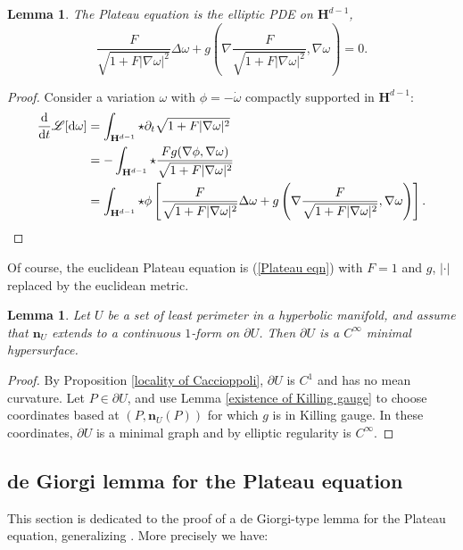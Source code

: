 \documentclass[reqno,12pt,letterpaper]{amsart}
\newcommand{\Hyp}{\mathbf H}
\newcommand*\dif{\mathop{}\!\mathrm{d}}
\newcommand{\Lagrange}{\mathscr L}
\newcommand{\normal}{\mathbf n}
\newtheorem{lemma}[theorem]{Lemma}
\theoremstyle{definition}
\numberwithin{equation}{section}
\begin{document}
\begin{lemma}
The Plateau equation is the elliptic PDE on $\Hyp^{d - 1}$,
\begin{equation}\label{Plateau eqn}
\frac{F}{\sqrt{1 + F |\nabla \omega|^2}} \Delta \omega + g\left(\nabla \frac{F}{\sqrt{1 + F |\nabla \omega|^2}}, \nabla \omega\right) = 0.
\end{equation}
\end{lemma}
\begin{proof}
Consider a variation $\omega$ with $\phi = -\dot \omega$ compactly supported in $\Hyp^{d - 1}$:
\begin{align*}
\frac{\dif}{\dif t} \Lagrange[\dif \omega] &= \int_{\Hyp^{d - 1}} \star \partial_t \sqrt{1 + F |\nabla \omega|^2} \\
&= -\int_{\Hyp^{d - 1}} \star \frac{F g(\nabla \phi, \nabla \omega)}{\sqrt{1 + F|\nabla \omega|^2}} \\
&= \int_{\Hyp^{d - 1}} \star \phi\left[\frac{F}{\sqrt{1 + F |\nabla \omega|^2}} \Delta \omega + g\left(\nabla \frac{F}{\sqrt{1 + F |\nabla \omega|^2}}, \nabla \omega\right)\right]. \qedhere
\end{align*}
\end{proof}

Of course, the euclidean Plateau equation is (\ref{Plateau eqn}) with $F = 1$ and $g$, $|\cdot|$ replaced by the euclidean metric.

\begin{lemma}\label{C1 implies smooth}
Let $U$ be a set of least perimeter in a hyperbolic manifold, and assume that $\normal_U$ extends to a continuous $1$-form on $\partial U$.
Then $\partial U$ is a $C^\infty$ minimal hypersurface.
\end{lemma}
\begin{proof}
By Proposition \ref{locality of Caccioppoli}, $\partial U$ is $C^1$ and has no mean curvature.
Let $P \in \partial U$, and use Lemma \ref{existence of Killing gauge} to choose coordinates based at $(P, \normal_U(P))$ for which $g$ is in Killing gauge.
In these coordinates, $\partial U$ is a minimal graph and by elliptic regularity is $C^\infty$.
\end{proof}

\subsection{de Giorgi lemma for the Plateau equation}
This section is dedicated to the proof of a de Giorgi-type lemma for the Plateau equation, generalizing \cite[Teorema 4.3]{Miranda66}.
More precisely we have:
\end{document}
